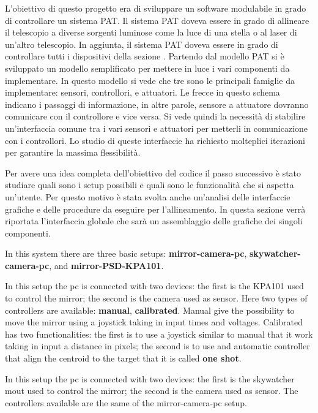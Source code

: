 L'obiettivo di questo progetto era di sviluppare un software modulabile in grado di controllare un sistema PAT. Il sistema PAT doveva essere in grado di allineare il telescopio a diverse sorgenti luminose come la luce di una stella o al laser di un'altro telescopio. In aggiunta, il sistema PAT doveva essere in grado di controllare tutti i dispositivi della sezione .
Partendo dal modello PAT  si è sviluppato un modello semplificato  per mettere in luce i vari componenti da implementare. In questo modello si vede che tre sono le principali famiglie da implementare: sensori, controllori, e attuatori. Le frecce in questo schema indicano i passaggi di informazione, in altre parole, sensore a attuatore dovranno comunicare con il controllore e vice versa. Si vede quindi la necessità di stabilire un'interfaccia comune tra i vari sensori e attuatori per metterli in comunicazione con i controllori. Lo studio di queste interfaccie ha richiesto molteplici iterazioni per garantire la massima flessibilità.

Per avere una idea completa dell'obiettivo del codice il passo successivo è stato studiare quali sono i setup possibili e quali sono le funzionalità che si aspetta un'utente. Per questo motivo è stata svolta anche un'analisi delle interfaccie grafiche e delle procedure da eseguire per l'allineamento. In questa sezione verrà riportata l'interfaccia globale che sarà un assemblaggio delle grafiche dei singoli componenti.

In this system there are three basic setups:
\textbf{mirror-camera-pc}, \textbf{skywatcher-camera-pc}, and \textbf{mirror-PSD-KPA101}.

In this setup the pc is connected with two devices: the first is
the KPA101 used to control the mirror; the second is the camera used as
sensor. Here two types of controllers are available: \textbf{manual},
\textbf{calibrated}. Manual give the possibility to move the mirror using a joystick taking
in input times and voltages. Calibrated has two functionalities: the first is to use a joystick
similar to manual that it work taking in input a distance in pixels; the
second is to use and automatic controller that align the centroid to the
target that it is called \textbf{one shot}.

In this setup the pc is connected with two devices: the first is
the skywatcher mout used to control the mirror; the second is the camera used as
sensor. The controllers available are the same of the mirror-camera-pc setup.

